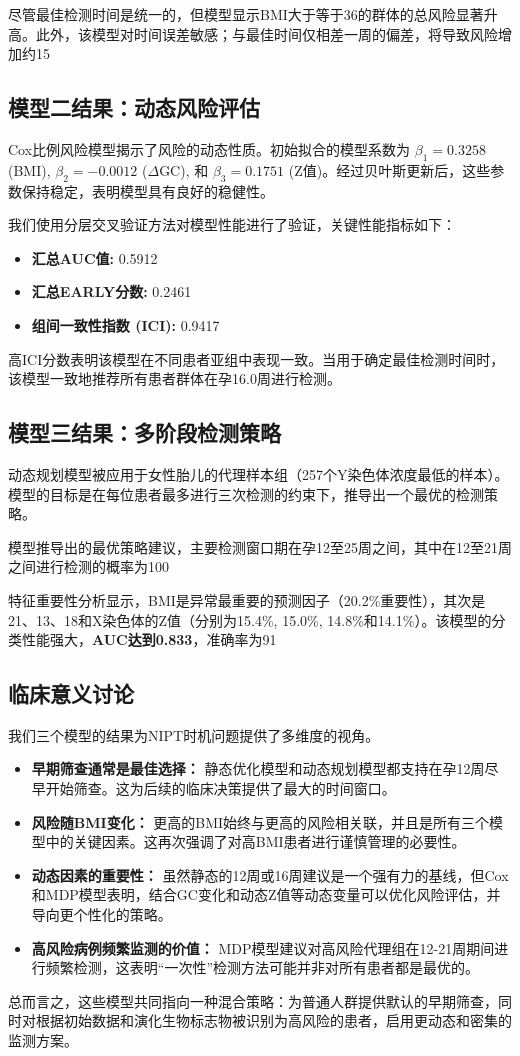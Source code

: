 \documentclass[UTF8, a4paper, 11pt]{ctexart}
\begin{document}
尽管最佳检测时间是统一的，但模型显示BMI大于等于36的群体的总风险显著升高。此外，该模型对时间误差敏感；与最佳时间仅相差一周的偏差，将导致风险增加约15%

\subsection{模型二结果：动态风险评估}
Cox比例风险模型揭示了风险的动态性质。初始拟合的模型系数为 $\beta_1=0.3258$ (BMI), $\beta_2=-0.0012$ ($\Delta$GC), 和 $\beta_3=0.1751$ (Z值)。经过贝叶斯更新后，这些参数保持稳定，表明模型具有良好的稳健性。

我们使用分层交叉验证方法对模型性能进行了验证，关键性能指标如下：
\begin{itemize}
    \item \textbf{汇总AUC值:} 0.5912
    \item \textbf{汇总EARLY分数:} 0.2461
    \item \textbf{组间一致性指数 (ICI):} 0.9417
\end{itemize}
高ICI分数表明该模型在不同患者亚组中表现一致。当用于确定最佳检测时间时，该模型一致地推荐所有患者群体在孕16.0周进行检测。

\subsection{模型三结果：多阶段检测策略}
动态规划模型被应用于女性胎儿的代理样本组（257个Y染色体浓度最低的样本）。模型的目标是在每位患者最多进行三次检测的约束下，推导出一个最优的检测策略。

模型推导出的最优策略建议，主要检测窗口期在孕12至25周之间，其中在12至21周之间进行检测的概率为100%

特征重要性分析显示，BMI是异常最重要的预测因子（20.2\%重要性），其次是21、13、18和X染色体的Z值（分别为15.4\%, 15.0\%, 14.8\%和14.1\%）。该模型的分类性能强大，\textbf{AUC达到0.833}，准确率为91%

\subsection{临床意义讨论}
我们三个模型的结果为NIPT时机问题提供了多维度的视角。
\begin{itemize}
    \item \textbf{早期筛查通常是最佳选择：} 静态优化模型和动态规划模型都支持在孕12周尽早开始筛查。这为后续的临床决策提供了最大的时间窗口。
    \item \textbf{风险随BMI变化：} 更高的BMI始终与更高的风险相关联，并且是所有三个模型中的关键因素。这再次强调了对高BMI患者进行谨慎管理的必要性。
    \item \textbf{动态因素的重要性：} 虽然静态的12周或16周建议是一个强有力的基线，但Cox和MDP模型表明，结合GC变化和动态Z值等动态变量可以优化风险评估，并导向更个性化的策略。
    \item \textbf{高风险病例频繁监测的价值：} MDP模型建议对高风险代理组在12-21周期间进行频繁检测，这表明“一次性”检测方法可能并非对所有患者都是最优的。
\end{itemize}
总而言之，这些模型共同指向一种混合策略：为普通人群提供默认的早期筛查，同时对根据初始数据和演化生物标志物被识别为高风险的患者，启用更动态和密集的监测方案。
\end{document}
